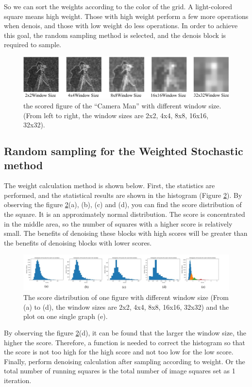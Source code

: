 \documentclass{article}
\begin{document}
So we can sort the weights according to the color of the grid. A light-colored square means high weight. Those with high weight perform a few more operations when denois, and those with low weight do less operations. In order to achieve this goal, the random sampling method is selected, and the denois block is required to sample.
\begin{figure}[h]
  \includegraphics[width=5.5in]{pic21.png}
  \centering
  \caption{the scored figure of the “Camera Man” with different window size. (From left to right, the window sizes are 2x2, 4x4, 8x8, 16x16, 32x32).}
  \label{img21}
\end{figure}

\subsection{Random sampling for the Weighted Stochastic method}
The weight calculation method is shown below. First, the statistics are performed, and the statistical results are shown in the histogram (Figure \ref{img22}). By observing the figure \ref{img22}(a), (b), (c) and (d), you can find the score distribution of the square. It is an approximately normal distribution. The score is concentrated in the middle area, so the number of squares with a higher score is relatively small. The benefits of denoising these blocks with high scores will be greater than the benefits of denoising blocks with lower scores.
\begin{figure}[h]
  \includegraphics[width=5.5in]{pic22.jpg}
  \centering
  \caption{The score distribution of one figure with different window size (From (a) to (d), the window sizes are 2x2, 4x4, 8x8, 16x16, 32x32) and the plot on one single graph (e).}
  \label{img22}
\end{figure}
By observing the figure \ref{img22}(d), it can be found that the larger the window size, the higher the score. Therefore, a function is needed to correct the histogram so that the score is not too high for the high score and not too low for the low score. Finally, perform denoising calculation after sampling according to weight. Or the total number of running squares is the total number of image squares set as 1 iteration.
\end{document}
